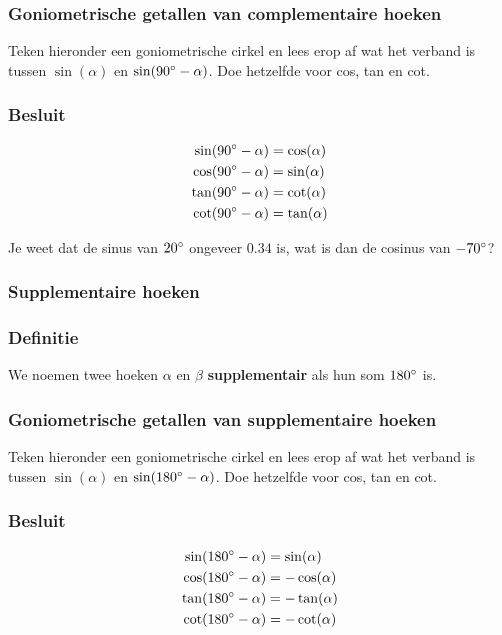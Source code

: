 \documentclass[twoside,a4paper,12pt]{article}
\begin{document}
\subsubsection*{Goniometrische getallen van complementaire hoeken}
Teken hieronder een goniometrische cirkel en lees erop af wat het verband is tussen $\sin(\alpha)$ en $\sin(90^\circ-\alpha)$. Doe hetzelfde voor cos, tan en cot.
\vspace*{7cm}

\subsubsection*{Besluit}
\begin{align*}
  \sin(90^\circ-\alpha)&=\cos(\alpha)\\
  \cos(90^\circ-\alpha)&=\sin(\alpha)\\
  \tan(90^\circ-\alpha)&=\cot(\alpha)\\
  \cot(90^\circ-\alpha)&=\tan(\alpha)
\end{align*}

\begin{oefening}
Je weet dat de sinus van $20^\circ$ ongeveer $0.34$ is, wat is dan de cosinus van $-70^\circ$?
\end{oefening}

\needspace{5cm}
\subsubsection{Supplementaire hoeken}

\subsubsection*{Definitie}
We noemen twee hoeken $\alpha$ en $\beta$ \textbf{supplementair} als hun som $180^\circ$ is.

\subsubsection*{Goniometrische getallen van supplementaire hoeken}
Teken hieronder een goniometrische cirkel en lees erop af wat het verband is tussen $\sin(\alpha)$ en $\sin(180^\circ-\alpha)$. Doe hetzelfde voor cos, tan en cot.
\vspace*{7cm}
\subsubsection*{Besluit}
\begin{align*}
  \sin(180^\circ-\alpha)&=\sin(\alpha)\\
  \cos(180^\circ-\alpha)&=-\cos(\alpha)\\
  \tan(180^\circ-\alpha)&=-\tan(\alpha)\\
  \cot(180^\circ-\alpha)&=-\cot(\alpha)
\end{align*}
\end{document}

